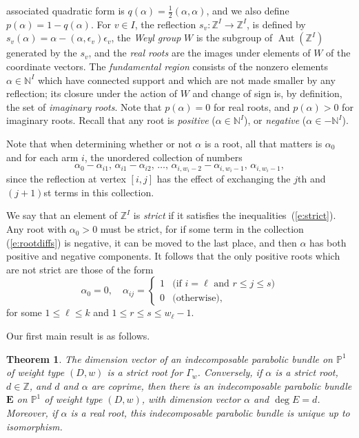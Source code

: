 \documentclass{amsart}
\theoremstyle{plain}
\newtheorem{thm}{Theorem}[section]
\theoremstyle{definition}
\theoremstyle{remark}
\newcommand{\Z}{\mathbb{Z}}
\newcommand{\N}{\mathbb{N}}
\newcommand{\PP}{\mathbb{P}}
\DeclareMathOperator{\Aut}{Aut}
\newcommand{\E}{\mathbf{E}}
\begin{document}
associated quadratic form is $q(\alpha) = \frac12 (\alpha,\alpha)$,
and we also define $p(\alpha)=1-q(\alpha)$. For $v\in I$, the
reflection $s_v : \Z^I \to \Z^I$, is defined by
$s_v(\alpha) = \alpha - (\alpha,\epsilon_v) \epsilon_v$, the \emph{Weyl group}
$W$ is the subgroup of $\Aut(\Z^I)$ generated by the $s_v$, and the
\emph{real roots} are the images under elements of $W$ of the coordinate
vectors. The \emph{fundamental region} consists of the nonzero elements
$\alpha\in\N^I$ which have connected support and which are not made smaller
by any reflection; its closure under the action of $W$ and change of sign is,
by definition, the set of \emph{imaginary roots}. Note that $p(\alpha)=0$ for
real roots, and $p(\alpha) > 0$ for imaginary roots. Recall that any root
is \emph{positive} ($\alpha\in\N^I$), or \emph{negative} ($\alpha\in-\N^I$).

Note that when determining whether or not $\alpha$ is a root,
all that matters is $\alpha_0$ and for each arm $i$, the unordered collection
of numbers
%
\begin{equation}
\label{e:rootdiffs}
\alpha_0 - \alpha_{i1}, \, \alpha_{i1}-\alpha_{i2}, \, \dots, \, \alpha_{i,w_i-2}-\alpha_{i,w_i-1}, \, \alpha_{i,w_i-1},
\end{equation}
%
since the reflection at vertex $[i,j]$ has the effect of exchanging the $j$th and $(j+1)$st terms
in this collection.

We say that an element of $\Z^I$ is \emph{strict} if it satisfies the inequalities~(\ref{e:strict}).
Any root with $\alpha_0>0$ must be strict, for if some term in the collection
(\ref{e:rootdiffs}) is negative, it can be moved to the last place, and then $\alpha$ has
both positive and negative components. It follows that
the only positive roots which are not strict are those of the form
%
\begin{equation}
\label{e:nonstrictroots}
\alpha_0=0,
\quad
\alpha_{ij} = \begin{cases}
1 & \text{(if $i=\ell$ and $r\le j\le s$)} \\
0 & \text{(otherwise),}
\end{cases}
\end{equation}
%
for some $1\le \ell\le k$ and $1\le r\le s\le w_\ell-1$.

Our first main result is as follows.


\begin{thm}\label{th:mainparroots}
The dimension vector of an indecomposable parabolic bundle on $\PP^1$
of weight type $(D,w)$ is a strict root for $\Gamma_w$.
Conversely, if $\alpha$ is a strict root,
$d\in\Z$, and $d$ and $\alpha$ are coprime, then there is an indecomposable
parabolic bundle $\E$ on $\PP^1$ of weight type $(D,w)$,
with dimension vector $\alpha$ and $\deg E = d$.
Moreover, if $\alpha$ is a real root, this indecomposable parabolic bundle
is unique up to isomorphism.
\end{thm}
\end{document}
